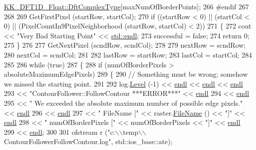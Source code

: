 \begin{DoxyCode}
      \hyperlink{class_k_k_b_1_1_k_k___d_f_t1_d_a4cbc827157dd30ddec2d3753e552a827}{KK\_DFT1D\_Float::DftComplexType}[maxNumOfBorderPoints];
266 \textcolor{preprocessor}{  #endif}
267 
268 
269   GetFirstPixel (startRow, startCol);
270   \textcolor{keywordflow}{if}  ((startRow < 0)  ||  (startCol < 0)  ||  (PixelCountIn9PixelNeighborhood (startRow, startCol) < 2))
271   \{
272     cout << \textcolor{stringliteral}{"Very Bad Starting Point"} << \hyperlink{namespace_k_k_b_ad1f50f65af6adc8fa9e6f62d007818a8}{std::endl};
273     successful = \textcolor{keyword}{false};
274     \textcolor{keywordflow}{return} 0;
275   \}
276 
277   GetNextPixel (scndRow, scndCol);
278 
279   nextRow = scndRow;
280   nextCol = scndCol;
281 
282   lastRow = startRow;
283   lastCol = startCol;
284 
285 
286   \textcolor{keywordflow}{while}  (\textcolor{keyword}{true})  
287   \{
288     \textcolor{keywordflow}{if}  (numOfBorderPixels > absoluteMaximumEdgePixels)
289     \{
290       \textcolor{comment}{// Something must be wrong;  somehow we missed the starting point.}
291 
292       log.\hyperlink{class_k_k_b_1_1_run_log_a32cf761d7f2e747465fd80533fdbb659}{Level} (-1) << \hyperlink{namespace_k_k_b_ad1f50f65af6adc8fa9e6f62d007818a8}{endl} << \hyperlink{namespace_k_k_b_ad1f50f65af6adc8fa9e6f62d007818a8}{endl} << \hyperlink{namespace_k_k_b_ad1f50f65af6adc8fa9e6f62d007818a8}{endl}
293                      << \textcolor{stringliteral}{"ContourFollower::FollowContour   ***ERROR***"} << \hyperlink{namespace_k_k_b_ad1f50f65af6adc8fa9e6f62d007818a8}{endl}
294                      << \hyperlink{namespace_k_k_b_ad1f50f65af6adc8fa9e6f62d007818a8}{endl}
295                      << \textcolor{stringliteral}{"     We exceeded the absolute maximum number of possible edge pixels."} << 
      \hyperlink{namespace_k_k_b_ad1f50f65af6adc8fa9e6f62d007818a8}{endl}
296                      << \hyperlink{namespace_k_k_b_ad1f50f65af6adc8fa9e6f62d007818a8}{endl}
297                      << \textcolor{stringliteral}{"     FileName          ["} << raster.\hyperlink{class_k_k_b_1_1_raster_a847b09bd1487b61bf126d7732f3694f2}{FileName} () << \textcolor{stringliteral}{"]"} << 
      \hyperlink{namespace_k_k_b_ad1f50f65af6adc8fa9e6f62d007818a8}{endl}
298                      << \textcolor{stringliteral}{"     numOfBorderPixels ["} << numOfBorderPixels  << \textcolor{stringliteral}{"]"} << 
      \hyperlink{namespace_k_k_b_ad1f50f65af6adc8fa9e6f62d007818a8}{endl}
299                      << \hyperlink{namespace_k_k_b_ad1f50f65af6adc8fa9e6f62d007818a8}{endl};
300 
301       ofstream r (\textcolor{stringliteral}{"c:\(\backslash\)\(\backslash\)temp\(\backslash\)\(\backslash\)ContourFollowerFollowContour.log"}, std::ios\_base::ate);

\end{DoxyCode}
